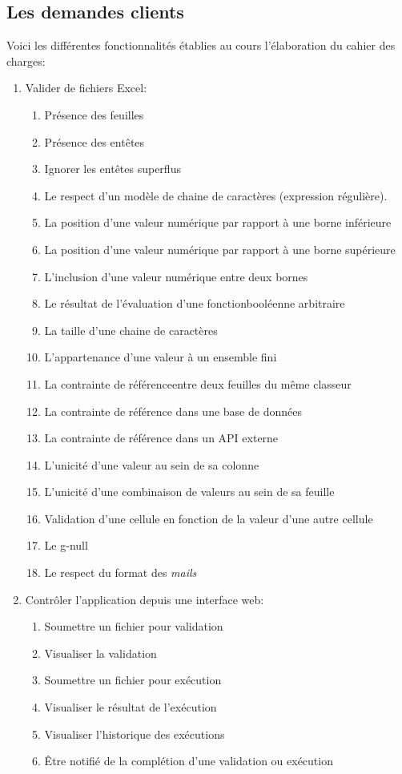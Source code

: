\subsection{Les demandes clients}
\label{subsec:customer-requests}

Voici les différentes fonctionnalités établies au cours l'élaboration du cahier des charges:
\begin{enumerate}
    \item Valider de fichiers Excel:
    \begin{enumerate}
        \item Présence des feuilles
        \item Présence des entêtes
        \item Ignorer les entêtes superflus
        \item Le respect d'un modèle de chaine de caractères (expression régulière\fnmark).
        \item La position d'une valeur numérique par rapport à une borne inférieure
        \item La position d'une valeur numérique par rapport à une borne supérieure
        \item L'inclusion d'une valeur numérique entre deux bornes
        \item Le résultat de l'évaluation d'une fonction\fnmark booléenne arbitraire
        \item La taille d'une chaine de caractères
        \item L'appartenance d'une valeur à un ensemble fini
        \item La contrainte de référence\fnmark entre deux feuilles du même classeur
        \item La contrainte de référence dans une base de données
        \item La contrainte de référence dans un API externe
        \item L'unicité d'une valeur au sein de sa colonne
        \item L'unicité d'une combinaison de valeurs au sein de sa feuille
        \item Validation d'une cellule en fonction de la valeur d'une autre cellule
        \item Le \gls{g-null}
        \item Le respect du format des \textit{mails}
    \end{enumerate}
    \item Contrôler l'application depuis une interface web:
    \begin{enumerate}
        \item Soumettre un fichier pour validation
        \item Visualiser la validation
        \item Soumettre un fichier pour exécution
        \item Visualiser le résultat de l'exécution
        \item Visualiser l'historique des exécutions
        \item Être notifié de la complétion d'une validation ou exécution
    \end{enumerate}
\end{enumerate}
    
